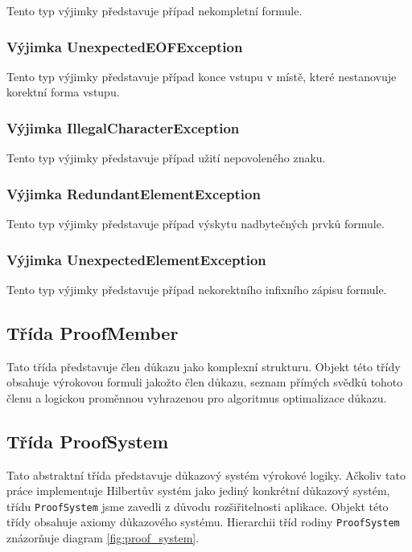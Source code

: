 \documentclass[thesis=B,czech,hidelinks]{thesis}[2012/06/26]
\begin{document}
Tento typ výjimky představuje případ nekompletní formule.

\subsubsection{Výjimka UnexpectedEOFException}

Tento typ výjimky představuje případ konce vstupu v místě, které nestanovuje korektní forma vstupu.

\subsubsection{Výjimka IllegalCharacterException}

Tento typ výjimky představuje případ užití nepovoleného znaku.

\subsubsection{Výjimka RedundantElementException}

Tento typ výjimky představuje případ výskytu nadbytečných prvků formule.

\subsubsection{Výjimka UnexpectedElementException}

Tento typ výjimky představuje případ nekorektního infixního zápisu formule.

\subsection{Třída ProofMember}

Tato třída představuje člen důkazu jako komplexní strukturu. Objekt této třídy obsahuje výrokovou formuli jakožto člen důkazu, seznam přímých svědků tohoto členu a logickou proměnnou vyhrazenou pro algoritmus optimalizace důkazu.

\subsection{Třída ProofSystem}

Tato abstraktní třída představuje důkazový systém výrokové logiky. Ačkoliv tato práce implementuje Hilbertův systém jako jediný konkrétní důkazový systém, třídu \texttt{ProofSystem} jsme zavedli z důvodu rozšiřitelnosti aplikace. Objekt této třídy obsahuje axiomy důkazového systému. Hierarchii tříd rodiny \texttt{ProofSystem} znázorňuje diagram \ref{fig:proof_system}.
\end{document}
